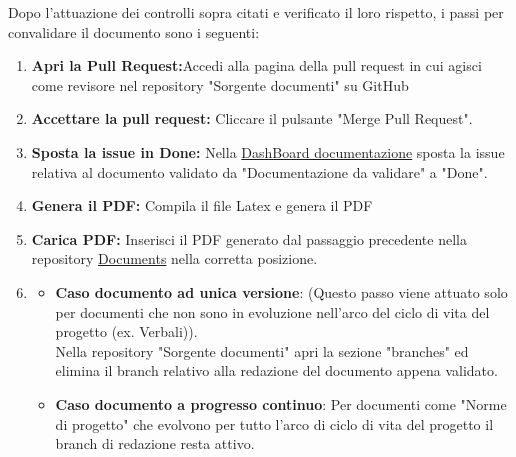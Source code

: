 \documentclass{article}
\begin{document}
Dopo l'attuazione dei controlli sopra citati e verificato il loro rispetto, i passi per convalidare il documento sono i seguenti:
\begin{enumerate}
 \item \textbf{Apri la Pull Request:}Accedi alla pagina della pull request in cui agisci come revisore nel repository "Sorgente documenti" su GitHub 
    \item \textbf{Accettare la pull request:} Cliccare il pulsante "Merge Pull Request".
     \item \textbf{Sposta la issue in Done:} Nella \href{https://github.com/orgs/ByteOps-swe/projects/1/views/1}{DashBoard documentazione} sposta la issue relativa al documento validato da "Documentazione da validare" a "Done".
     \item \textbf{Genera il PDF:} Compila il file Latex e genera il PDF 
     \item \textbf{Carica PDF:} Inserisci il PDF generato dal passaggio precedente nella repository \href{https://github.com/ByteOps-swe/Documents}{Documents} nella corretta posizione.
     \item \begin{itemize} \item \textbf{Caso documento ad unica versione}:
      (Questo passo viene attuato solo per documenti che non sono in evoluzione nell'arco del ciclo di vita del progetto (ex. Verbali)).\\Nella repository "Sorgente documenti" apri la sezione "branches" ed elimina il branch relativo alla redazione del documento appena validato.
    
      \item \textbf{Caso documento a progresso continuo}: Per documenti come "Norme di progetto" che evolvono per tutto l'arco di ciclo di vita del progetto il branch di redazione resta attivo. 
    \end{itemize}
     
\end{enumerate}
\end{document}
